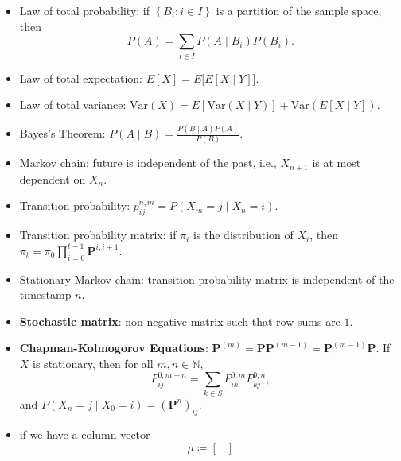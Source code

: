 \documentclass[10pt]{article}
\begin{document}
    \begin{multicols*}{2}
        \begin{itemize}
            \item Law of total probability: if $\left\{B_i \colon i \in I\right\}$ is a partition of the sample space, then
            \begin{equation*}
                P\left(A\right) = \sum_{i \in I}P\left(A \mid B_i\right)P\left(B_i\right).
            \end{equation*}
            \item Law of total expectation: $E\left[X\right] = E\bigl[E\left[X \mid Y\right]\bigr]$.
            \item Law of total variance: $\mathrm{Var}\left(X\right) = E\left[\mathrm{Var}\left(X \mid Y\right)\right] + \mathrm{Var}\left(E\left[X \mid Y\right]\right)$.
            \item Bayes's Theorem: $P\left(A \mid B\right) = \frac{P\left(B \mid A\right)P\left(A\right)}{P\left(B\right)}$.
            \item Markov chain: future is independent of the past, i.e., $X_{n + 1}$ is at most dependent on $X_n$.
            \item Transition probability: $p_{ij}^{n, m} = P\left(X_m = j \mid X_n = i\right)$.
            \item Transition probability matrix: if $\pi_i$ is the distribution of $X_i$, then $\pi_t = \pi_0\prod_{i = 0}^{t - 1}\bm{P}^{i, i + 1}$.
            \item Stationary Markov chain: transition probability matrix is independent of the timestamp $n$.
            \item \textbf{Stochastic matrix}: non-negative matrix such that row sums are $1$.
            \item \textbf{Chapman-Kolmogorov Equations}: $\bm{P}^{\left(m\right)} = \bm{P}\bm{P}^{\left(m - 1\right)} = \bm{P}^{\left(m - 1\right)}\bm{P}$. If $X$ is stationary, then for all $m, n \in \mathbb{N}$,
            \begin{equation*}
                P^{0, m + n}_{ij} = \sum_{k \in S}P^{0, m}_{ik}P^{0, n}_{kj},
            \end{equation*}
            and $P\left(X_n = j \mid X_0 = i\right) = \left(\bm{P}^n\right)_{ij}$.
            \item if we have a column vector 
            \begin{equation*}
                \mu \coloneqq \begin{bmatrix}

\end{bmatrix}
\end{equation*}
\end{itemize}
\end{multicols*}
\end{document}

